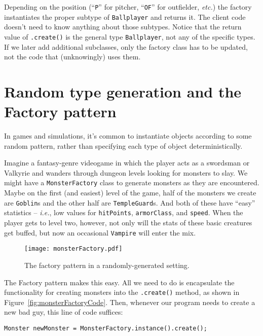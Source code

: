 Depending on the position (``\texttt{P}'' for pitcher, ``\texttt{OF}'' for
outfielder, \textit{etc.}) the factory instantiates the proper subtype of
\texttt{Ballplayer} and returns it. The client code doesn't need to know
anything about those subtypes. Notice that the return value of
\texttt{.create()} is the general type \texttt{Ballplayer}, not any of the
specific types. If we later add additional subclasses, only the factory class
has to be updated, not the code that (unknowingly) uses them.

\section{Random type generation and the Factory pattern}

In games and simulations, it's common to instantiate objects according to some
random pattern, rather than specifying each type of object deterministically.

Imagine a fantasy-genre videogame in which the player acts as a swordsman or
Valkyrie and wanders through dungeon levels looking for monsters to slay. We
might have a \texttt{MonsterFactory} class to generate monsters as they are
encountered. Maybe on the first (and easiest) level of the game, half of the
monsters we create are \texttt{Goblin}s and the other half are
\texttt{TempleGuard}s. And both of these have ``easy'' statistics --
\textit{i.e.}, low values for \texttt{hitPoints}, \texttt{armorClass}, and
\texttt{speed}. When the player gets to level two, however, not only will the
stats of these basic creatures get buffed, but now an occasional
\texttt{Vampire} will enter the mix.

\begin{figure}
\centering
\texttt{[image: monsterFactory.pdf]}
\caption{The factory pattern in a randomly-generated setting.}
\label{fig:monsterFactory}
\end{figure}

The Factory pattern makes this easy. All we need to do is encapsulate the
functionality for creating monsters into the \texttt{.create()} method, as
shown in Figure~\ref{fig:monsterFactoryCode}. Then, whenever our program needs
to create a new bad guy, this line of code suffices:

\begin{Verbatim}[fontsize=\small,samepage=true,frame=none]
  Monster newMonster = MonsterFactory.instance().create();
\end{Verbatim}

